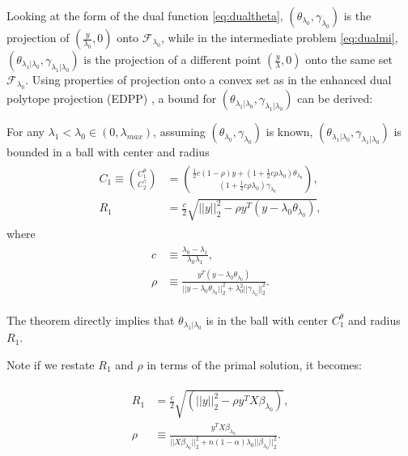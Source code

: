 Looking at the form of the dual function \eqref{eq:dualtheta}, $(\theta_{\lambda_0},\gamma_{\lambda_0})$ is the projection of $(\frac{y}{\lambda_0},0)$ onto $\mathcal{F}_{\lambda_0}$, while in the intermediate problem \eqref{eq:dualmi}, $(\theta_{\lambda_1|\lambda_0},\gamma_{\lambda_1|\lambda_0})$ is the projection of a different point $(\frac{y}{\lambda},0)$ onto the same set $\mathcal{F}_{\lambda_0}$. Using properties of projection onto a convex set as in the enhanced dual polytope projection (EDPP) \citep{wang2013lasso}, a bound for $(\theta_{\lambda_1|\lambda_0},\gamma_{\lambda_1|\lambda_0})$ can be derived:

\begin{theorem}
    \label{thm:1.1}
    For any $\lambda_1<\lambda_{0}\in (0,\lambda_{max})$, assuming $(\theta_{\lambda_0},\gamma_{\lambda_0})$ is known, $(\theta_{\lambda_1|\lambda_0},\gamma_{\lambda_1|\lambda_0})$ is bounded in a ball with center and radius
    \begin{gather}
        \begin{aligned}
            C_1\equiv\binom{C_1^\theta}{C_2^\gamma}&=\binom{\frac{1}{2}c(1-\rho)y+(1+\frac{1}{2}c\rho\lambda_0)\theta_{\lambda_0}}{(1+\frac{1}{2}c\rho\lambda_0)\gamma_{\lambda_0}},\\
            R_1&=\frac{c}{2}\sqrt{||y||_2^2-\rho y^T(y-\lambda_0\theta_{\lambda_0})},
        \end{aligned}
    \end{gather}
    where
    \begin{gather}
        \begin{aligned}
            c&\equiv\frac{\lambda_0-\lambda_1}{\lambda_0\lambda_1},\\
            \rho&\equiv\frac{y^T(y-\lambda_0\theta_{\lambda_0})}{||y-\lambda_0\theta_{\lambda_0}||_2^2+\lambda_0^2||\gamma_{\lambda_0}||_2^2}.\nonumber
        \end{aligned}
    \end{gather}
\end{theorem}

The theorem  directly implies that $\theta_{\lambda_1|\lambda_0}$ is in the ball with center $C_1^\theta$ and radius $R_1$.

Note if we restate $R_1$ and $\rho$ in terms of the primal solution, it becomes:

\begin{gather}
    \label{eq:thm1prim}
    \begin{aligned}
        R_1&=\frac{c}{2}\sqrt{(||y||_2^2-\rho y^TX\beta_{\lambda_0})},\\
        \rho&\equiv\frac{y^TX\beta_{\lambda_0}}{||X\beta_{\lambda_0}||_2^2+n(1-\alpha)\lambda_0||\beta_{\lambda_0}||_2^2}.
    \end{aligned}
\end{gather}

